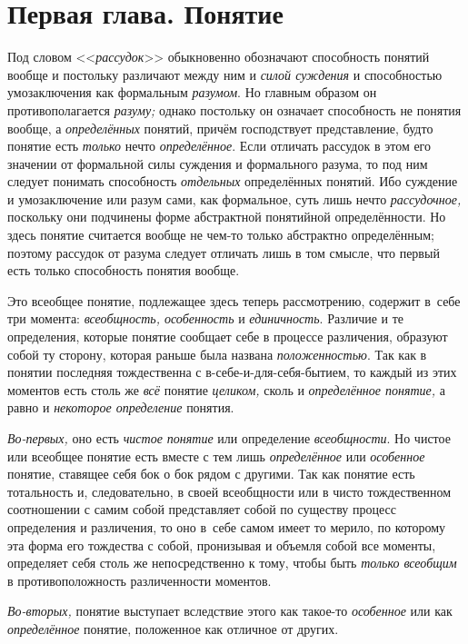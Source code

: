 \bigskip

\chapter[{\em Первая глава} Понятие]{Первая глава. Понятие}

Под словом <<{\em рассудок}>> обыкновенно обозначают способность
понятий вообще и постольку различают между
ним и {\em силой суждения} и способностью умозаключения как формальным
{\em разумом}. Но главным образом он противополагается
{\em разуму;} однако постольку он означает способность не понятия вообще, а
{\em определённых} понятий, причём господствует представление, будто понятие
есть {\em только} нечто {\em определённое}. Если
отличать рассудок в этом его значении от формальной силы суждения и
формального разума, то под ним следует понимать способность {\em отдельных}
определённых понятий. Ибо суждение и умозаключение или разум
сами, как формальное, суть лишь нечто {\em рассудочное,}
поскольку они подчинены форме абстрактной понятийной
определённости. Но здесь понятие считается вообще не чем-то только
абстрактно определённым; поэтому рассудок от разума следует отличать лишь в
том смысле, что первый есть только способность понятия вообще.

Это всеобщее понятие, подлежащее здесь теперь рассмотрению,
содержит в~себе три момента: {\em всеобщность, особенность} и
{\em единичность}. Различие и те определения, которые понятие сообщает себе
в процессе различения, образуют собой ту сторону, которая раньше была названа
{\em положенностью}. Так
как в понятии последняя тождественна с в-себе-и-для-себя-бытием, то каждый
из этих моментов есть столь же {\em всё} понятие {\em целиком,} сколь и
{\em определённое понятие,} а равно и {\em некоторое определение} понятия.

{\em Во-первых,} оно есть {\em чистое понятие} или определение
{\em всеобщности}. Но чистое или всеобщее понятие есть вместе с тем лишь
{\em определённое} или {\em особенное} понятие,
ставящее себя бок о бок рядом с другими. Так как понятие есть тотальность
и, следовательно, в своей всеобщности или в чисто тождественном соотношении
с самим собой представляет собой по существу процесс определения и
различения, то оно в~себе самом имеет то мерило, по которому эта форма его
тождества с собой, пронизывая и объемля собой все моменты, определяет себя
столь же непосредственно к тому, чтобы быть
{\em только всеобщим} в противоположность различенности моментов.

{\em Во-вторых,} понятие выступает вследствие этого как такое-то
{\em особенное} или как {\em определённое} понятие, положенное как
отличное от других.

